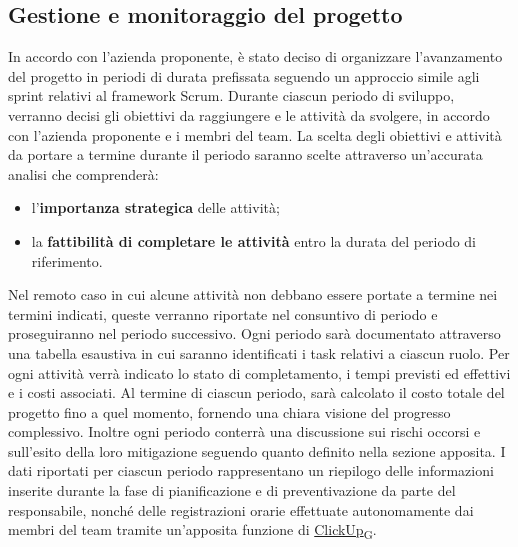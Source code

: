 \subsection{Gestione e monitoraggio del progetto}
In accordo con l'azienda proponente, è stato deciso di organizzare l’avanzamento del progetto in periodi di durata prefissata seguendo un approccio simile agli sprint relativi al framework Scrum.
Durante ciascun periodo di sviluppo, verranno decisi gli obiettivi da raggiungere e le attività da svolgere, in accordo con l'azienda proponente e i membri del team. La scelta degli obiettivi e attività da portare a termine durante il periodo saranno scelte attraverso un'accurata analisi che comprenderà:
\begin{itemize}
    \item l'\textbf{importanza strategica} delle attività;
    \item la \textbf{fattibilità di completare le attività} entro la durata del periodo di riferimento.
\end{itemize}
Nel remoto caso in cui alcune attività non debbano essere portate a termine nei termini indicati, queste verranno riportate nel consuntivo di periodo e proseguiranno nel periodo successivo. Ogni periodo sarà documentato attraverso una tabella esaustiva in cui saranno identificati i task relativi a ciascun ruolo. Per ogni attività verrà indicato lo stato di completamento, i tempi previsti ed effettivi e i costi associati. Al termine di ciascun periodo, sarà calcolato il costo totale del progetto fino a quel momento, fornendo una chiara visione del progresso complessivo. Inoltre ogni periodo conterrà una discussione sui rischi occorsi e sull’esito della loro mitigazione seguendo quanto definito nella sezione apposita. I dati riportati per ciascun periodo rappresentano un riepilogo delle informazioni inserite durante la fase di pianificazione e di preventivazione da parte del responsabile, nonché delle registrazioni orarie effettuate autonomamente dai membri del team tramite un'apposita funzione di \href{https://7last.github.io/docs/rtb/documentazione-interna/glossario#clickup}{ClickUp\textsubscript{G}}.

